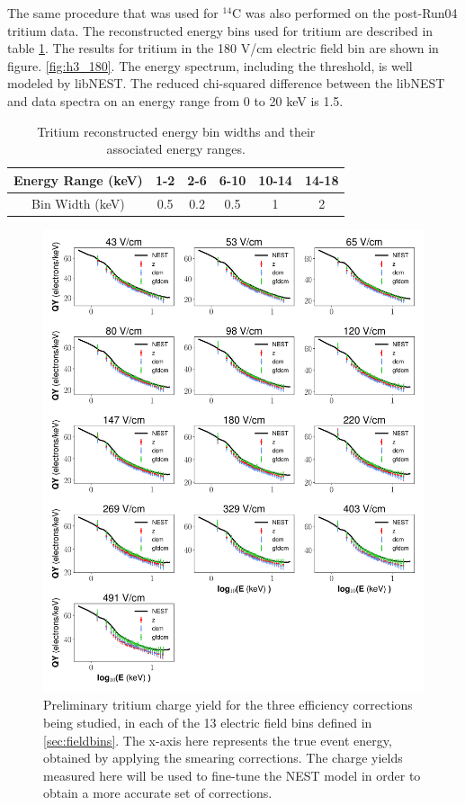 The same procedure that was used for $^{14}$C was also performed on the post-Run04 tritium data. The reconstructed energy bins used for tritium are described in table \ref{tab:ebins_h3}. The results for tritium in the 180 V/cm electric field bin are shown in figure. \ref{fig:h3_180}. The energy spectrum, including the threshold, is well modeled by libNEST. The reduced chi-squared difference between the libNEST and data spectra on an energy range from 0 to 20 keV is 1.5.

\begin{table}[h!]
\centering
    \begin{tabular}{ c || c | c | c | c | c  }
    \hline
    Energy Range (keV) & 1-2 & 2-6  & 6-10 & 10-14 & 14-18\\
    \hline
    Bin Width (keV)         &  0.5       & 0.2      &  0.5         & 1           & 2 \\
    \hline
    \end{tabular}
    \caption{Tritium reconstructed energy bin widths and their associated energy ranges.}
    \label{tab:ebins_h3}
\end{table}

\begin{figure}[h!]
\centering
\includegraphics[width=\textwidth]{Figures/H3_QY_prelim.pdf}
\caption{Preliminary tritium charge yield for the three efficiency corrections being studied, in each of the 13 electric field bins defined in \ref{sec:fieldbins}. The x-axis here represents the true event energy, obtained by applying the smearing corrections. The charge yields measured here will be used to fine-tune the NEST model in order to obtain a more accurate set of corrections.}
\label{fig:H3_QY_prelim}
\end{figure}

